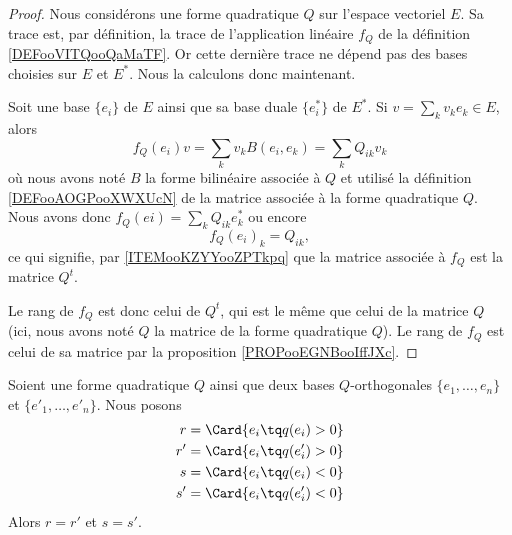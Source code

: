\begin{proof}
	Nous considérons une forme quadratique \( Q\) sur l'espace vectoriel \( E\). Sa trace est, par définition, la trace de l'application linéaire \( f_Q\) de la définition \ref{DEFooVITQooQaMaTF}. Or cette dernière trace ne dépend pas des bases choisies sur \( E\) et \( E^*\). Nous la calculons donc maintenant.

	Soit une base \( \{ e_i \}\) de \( E\) ainsi que sa base duale \( \{ e_i^* \}\) de \( E^*\). Si \( v=\sum_kv_ke_k\in E\), alors
	\begin{equation}
		f_Q(e_i)v=\sum_kv_kB(e_i,e_k)=\sum_kQ_{ik}v_k
	\end{equation}
	où nous avons noté \( B\) la forme bilinéaire associée à \( Q\) et utilisé la définition \ref{DEFooAOGPooXWXUcN} de la matrice associée à la forme quadratique \( Q\). Nous avons donc \( f_Q(ei)=\sum_kQ_{ik}e_k^*\) ou encore
	\begin{equation}
		f_Q(e_i)_k=Q_{ik},
	\end{equation}
	ce qui signifie, par \ref{ITEMooKZYYooZPTkpq} que la matrice associée à \( f_Q\) est la matrice \( Q^t\).

	Le rang de \( f_Q\) est donc celui de \( Q^t\), qui est le même que celui de la matrice \( Q\) (ici, nous avons noté \( Q\) la matrice de la forme quadratique \( Q\)). Le rang de \( f_Q\) est celui de sa matrice par la proposition \ref{PROPooEGNBooIffJXc}.
\end{proof}


\begin{lemma}     \label{LEMooISHCooVDJEKo}
	Soient une forme quadratique \( Q\) ainsi que deux bases \( Q\)-orthogonales \( \{ e_1,\ldots, e_n \}\) et \( \{ e'_1,\ldots, e'_n \}\). Nous posons
	\begin{subequations}
		\begin{align}
			r  & =\Card\{ e_i\tq q(e_i)>0 \}  \\
			r' & =\Card\{ e_i\tq q(e'_i)>0 \} \\
			s  & =\Card\{ e_i\tq q(e_i)<0 \}  \\
			s' & =\Card\{ e_i\tq q(e'_i)<0 \}
		\end{align}
	\end{subequations}
	Alors \( r=r'\) et \( s=s'\).
\end{lemma}

